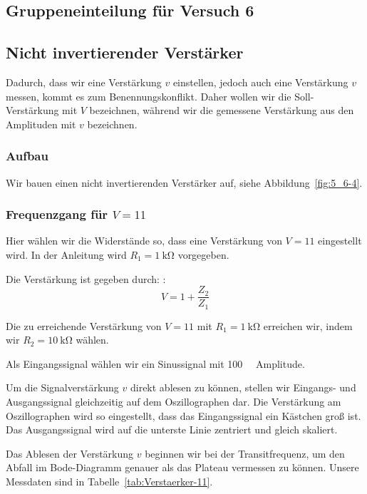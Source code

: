 \FloatBarrier
\subsection{Gruppeneinteilung für Versuch 6}

\FloatBarrier
\subsection{Nicht invertierender Verstärker}

Dadurch, dass wir eine Verstärkung $v$ einstellen, jedoch auch eine Verstärkung
$v$ messen, kommt es zum Benennungskonflikt. Daher wollen wir die
Soll-Verstärkung mit $V$ bezeichnen, während wir die gemessene Verstärkung aus
den Amplituden mit $v$ bezeichnen.

\subsubsection{Aufbau}

Wir bauen einen nicht invertierenden Verstärker auf, siehe
Abbildung~\ref{fig:5_6-4}. 

\subsubsection{Frequenzgang für $V = 11$}

Hier wählen wir die Widerstände so, dass eine Verstärkung von $V = 11$
eingestellt wird. In der Anleitung wird $R_1 = \SI{1}{\kilo\ohm}$ vorgegeben.

Die Verstärkung ist gegeben durch: \cite[Formel~5/6.6]{physik313-Anleitung}:
\[
	V = 1 + \frac{Z_2}{Z_1}
\]

Die zu erreichende Verstärkung von $V = 11$ mit $R_1 = \SI{1}{\kilo\ohm}$
erreichen wir, indem wir $R_2 = \SI{10}{\kilo\ohm}$ wählen.

Als Eingangssignal wählen wir ein Sinussignal mit \SI{100}{\milli\voltss}
Amplitude.

Um die Signalverstärkung $v$ direkt ablesen zu können, stellen wir Eingangs-
und Ausgangssignal gleichzeitig auf dem Oszillographen dar. Die Verstärkung am
Oszillographen wird so eingestellt, dass das Eingangssignal ein Kästchen groß
ist. Das Ausgangssignal wird auf die unterste Linie zentriert und gleich
skaliert.

Das Ablesen der Verstärkung $v$ beginnen wir bei der Transitfrequenz, um den
Abfall im Bode-Diagramm genauer als das Plateau vermessen zu können. Unsere
Messdaten sind in Tabelle~\ref{tab:Verstaerker-11}.

